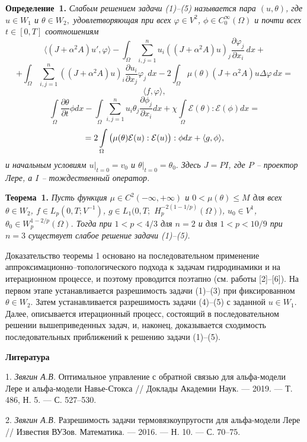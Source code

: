 \textbf{Определение~1.} {\it
	Слабым решением задачи (1)--(5) называется пара $(u, \theta)$, где $u \in W_1$ и $\theta \in W_2,$ удовлетворяющая при всех $\varphi \in V^2$, $ \phi \in C^{\infty}_0(\Omega)$ и почти всех $t\in [0,T]$ соотношениям
$$
	\langle (J+\alpha^2A)u', \varphi\rangle - \int_\Omega\sum_{i, j=1}^nu_i((J+\alpha^2A)u)_j
	\frac{\partial\varphi_j}{\partial x_i}\,dx +$$
	$$+ \int_\Omega\sum_{i, j=1}^n((J+\alpha^2A)u)_i\frac{\partial u_i}{\partial x_j}
	\varphi_j\,dx
	- 2\int_\Omega \mu(\theta) (J+\alpha^2A)u\Delta\varphi\,dx=$$
	$$
	\langle f, \varphi\rangle,$$ $$
	\int\limits_\Omega \frac{\partial\theta}{\partial t}\phi dx-\int\limits_\Omega\sum\limits_{i,j=1}^n
	u_i\theta_j\frac{\partial \phi_j}{\partial x_i} dx+\chi\int\limits_\Omega
	\mathcal{E}(\theta):\mathcal{E}( \phi) dx=$$ $$= 2\int\limits_\Omega\big{(}{\mu}(\theta)  \mathcal {E}(u): \mathcal {E}(u)\big{)}:\phi dx+\langle g,\phi\rangle,\label{f4}
$$
	и начальным условиям $u|_{t=0} = v_0$ и $\theta|_{t=0}=\theta_0.$ Здесь $J=PI$, где $P$ -- проектор Лере, а $I$  -- тождественный оператор.}

\textbf{Теорема~1.} {\it  Пусть  функция $\mu \in C^2(-\infty,+\infty)$ и $0<\mu(\theta)\leq M$ для всех $\theta \in W_2$, $f \in L_p(0,T;V^{-1})$, $g \in L_1(0,T;$ $H^{-2(1-1/p)}_p(\Omega))$, $u_0 \in V^1$, $\theta_0 \in W^{1-2/p}_p(\Omega)$. Тогда при $1<p<4/3$ для $n=2$ и для $1<p<10/9$ при $n=3$ существует слабое решение задачи (1)--(5).}

Доказательство теоремы 1 основано на последовательном применение аппроксимационно--топологического подхода к задачам гидродинамики и на итерационном процессе, и поэтому проводится поэтапно (см. работы [2]--[6]). На первом этапе устанавливается разрешимость задачи (1)--(3) при фиксированном  $\theta \in W_2$. Затем устанавливается разрешимость задачи (4)--(5) с заданной $u \in W_1$. Далее, описывается итерационный процесс, состоящий в последовательном решении вышеприведенных задач, и, наконец, доказывается сходимость последовательных приближений к решению задачи (1)--(5).




\smallskip \centerline {\bf Литература} \nopagebreak

1. {\it Звягин А.В.} Оптимальное управление с обратной связью для альфа-модели Лере и альфа-модели Навье-Стокса // Доклады Академии Наук. --- 2019. --- Т. 486, Н. 5. --- С. 527--530.

2. {\it Звягин А.В.} Разрешимость задачи термовязкоупругости для альфа-модели Лере // Известия ВУЗов. Математика. --- 2016. --- Н. 10. --- С. 70--75.

